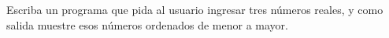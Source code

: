 Escriba un programa que pida al usuario
ingresar tres números reales,
y como salida muestre esos números
ordenados de menor a mayor.

\begin{minipage}[t]{.25\textwidth}
  
\end{minipage}
\hfil
\begin{minipage}[t]{.25\textwidth}
  
\end{minipage}
